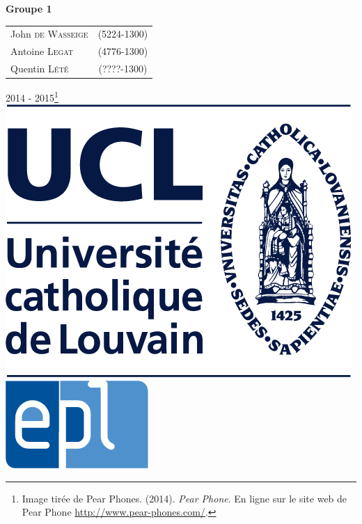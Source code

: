 \begin{titlepage}
	{ \Large
	\begin{center}
	\textbf{Groupe 1}
	\end{center}
	}
	
		
	\vspace{0.2cm}	
	
      \begin{tabular}{lc}
     John \textsc{de Wasseige} & (5224-1300) \\
	Antoine \textsc{Legat} & (4776-1300) \\
	Quentin \textsc{Lété} & (????-1300) \\
      \end{tabular}
      
      \vfill
      





\vfill
{\normalsize 2014 - 2015\footnote{Image tirée de Pear Phones. (2014). \textit{Pear Phone}. En ligne sur le site web de Pear Phone \url{http://www.pear-phones.com/}.}}\\

  \includegraphics[height = 0.07\textheight]{img/ucl.png} \hfill
  \includegraphics[height = 0.07\textheight]{img/epl.jpg}

\end{titlepage}